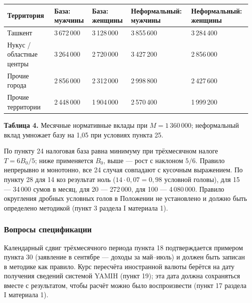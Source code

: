 \documentclass[14pt,a4paper]{extarticle}
\begin{document}
\begingroup\fontsize{11bp}{13.2bp}\selectfont
\begin{longtable}{p{} p{} p{} p{} p{}}
\toprule
Территория & База: мужчины & База: женщины & Неформальный: мужчины & Неформальный: женщины \\
\midrule
\endhead
Ташкент & 3\,672\,000 & 3\,128\,000 & 3\,855\,600 & 3\,284\,400 \\
Нукус / областные центры & 3\,264\,000 & 2\,720\,000 & 3\,427\,200 & 2\,856\,000 \\
Прочие города & 2\,856\,000 & 2\,312\,000 & 2\,998\,800 & 2\,427\,600 \\
Прочие территории & 2\,448\,000 & 1\,904\,000 & 2\,570\,400 & 1\,999\,200 \\
\bottomrule
\end{longtable}
\endgroup
\textbf{Таблица 4.} Месячные нормативные вклады при $M=1\,360\,000$; неформальный вклад умножает базу на 1,05 при условиях пункта 25.

По пункту 24 налоговая база равна минимуму при трёхмесячном налоге $T=6B_0/5$; ниже применяется $B_0$, выше — рост с наклоном $5/6$. Правило непрерывно и монотонно, все 24 случая совпадают с кусочным выражением. По пункту 28 для 14 коз результат ноль ($14\cdot0{,}07=0{,}98$ условной головы), для 15 — 34\,000 сумов в месяц, для 20 — 272\,000, для 100 — 4\,080\,000. Правило округления дробных условных голов в Положении не установлено и должно быть определено методикой (пункт 3 раздела I материала 1).

\subsubsection{Вопросы спецификации}\label{res:spec}
Календарный сдвиг трёхмесячного периода пункта 18 подтверждается примером пункта 30 (заявление в сентябре — доходы за май–июль) и должен быть записан в методике как правило. Курс пересчёта иностранной валюты берётся на дату получения сведений системой YAMIH (пункт 19); эта дата должна сохраняться вместе с результатом, чтобы расчёт можно было воспроизвести (пункт 17 раздела I материала 1).
\end{document}
